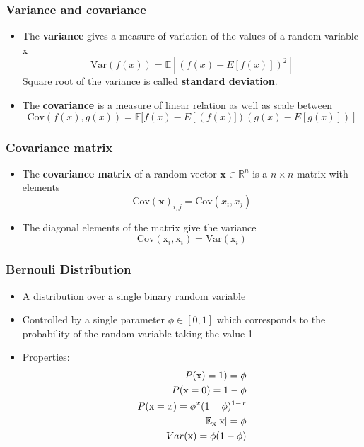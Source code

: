 \documentclass[notes]{beamer}          %
\newcommand{\vect}[1]{\bm{#1}}
\newcommand{\field}[1]{\mathbb{#1}}
\newcommand{\R}{\field{R}}
\begin{document}
\begin{frame}
\frametitle{Variance and covariance}
\begin{itemize}
    \item The {\bf variance} gives a measure of variation of the values of a random variable x $$\mbox{Var}(f(x)) = \field{E}[(f(x) - E[f(x)])^2]$$
    Square root of the variance is called {\bf standard deviation}.

    \item The {\bf covariance} is a measure of linear relation as well as scale between $$\mbox{Cov}(f(x),g(x)) = \field{E}[f(x) - E[(f(x)])(g(x) - E[g(x)])]$$
\end{itemize}

\end{frame}


\begin{frame}
\frametitle{Covariance matrix}
    \begin{itemize}
        \item The {\bf covariance matrix} of a random vector $\vect{x} \in \R^n$ is a $n \times n$ matrix with elements
    $$
    \mbox{Cov}(\vect{x})_{i,j} = \mbox{Cov}(x_i,x_j)
    $$
    \item The diagonal elements of the matrix give the variance
    $$
      \mbox{Cov}(\text{x}_i,\text{x}_i) = \mbox{Var}(\text{x}_i)
    $$
    \end{itemize}

\end{frame}



\begin{frame}
\frametitle{Bernouli Distribution}
\begin{itemize}
    \item A distribution over a single binary random variable
    \item Controlled by a single parameter $\phi \in [0,1]$ which corresponds to the probability of the random variable taking the value 1
    \item Properties:
    \begin{eqnarray*}
    P({\rm x}) = 1) = \phi \\
    P({\rm x} = 0) = 1 - \phi \\
    P({\rm x} = x) = \phi^x (1-\phi)^{1-x} \\
    \field{E}_\text{x}[\text{x}] = \phi \\
    Var(\text{x}) = \phi(1-\phi)
    \end{eqnarray*}
\end{itemize}
\end{frame}
\end{document}
